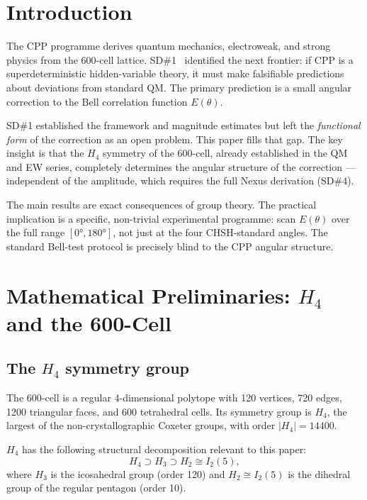\documentclass[11pt,a4paper]{article}
\begin{document}
\tableofcontents
\newpage

\section{Introduction}

The CPP programme derives quantum mechanics, electroweak, and strong
physics from the 600-cell lattice.  SD\#1~\citep{cpp_sd1} identified
the next frontier: if CPP is a superdeterministic hidden-variable
theory, it must make falsifiable predictions about deviations from
standard QM.  The primary prediction is a small angular correction to
the Bell correlation function $E(\theta)$.

SD\#1 established the framework and magnitude estimates but left the
\emph{functional form} of the correction as an open problem.  This
paper fills that gap.  The key insight is that the $H_4$ symmetry of
the 600-cell, already established in the QM and EW series, completely
determines the angular structure of the correction --- independent of
the amplitude, which requires the full Nexus derivation (SD\#4).

The main results are exact consequences of group theory.  The
practical implication is a specific, non-trivial experimental
programme: scan $E(\theta)$ over the full range $[0°, 180°]$, not
just at the four CHSH-standard angles.  The standard Bell-test
protocol is precisely blind to the CPP angular structure.

\section{Mathematical Preliminaries: $H_4$ and the 600-Cell}

\subsection{The $H_4$ symmetry group}

The 600-cell is a regular 4-dimensional polytope with 120 vertices,
720 edges, 1200 triangular faces, and 600 tetrahedral cells.  Its
symmetry group is $H_4$, the largest of the non-crystallographic
Coxeter groups, with order $|H_4| = 14400$.

$H_4$ has the following structural decomposition relevant to this
paper:
\begin{equation}
H_4 \supset H_3 \supset H_2 \cong I_2(5),
\label{eq:H4_chain}
\end{equation}
where $H_3$ is the icosahedral group (order 120) and $H_2 \cong
I_2(5)$ is the dihedral group of the regular pentagon (order 10).
\end{document}
